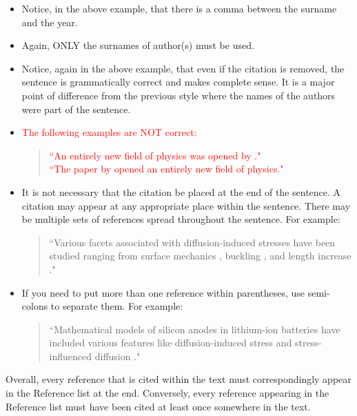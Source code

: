 \begin{itemize}
\item Notice, in the above example, that there is a comma between the surname and the year. 

\item Again, ONLY the surnames of author(s) must be used. 

\item Notice, again in the above example, that even if the citation is removed, the sentence is grammatically correct and makes complete sense. It is a major point of difference from the previous style where the names of the authors were part of the sentence. 

\item \textcolor{red}{The following examples are NOT correct:}
\begin{quote}
\textcolor{red}{``An entirely new field of physics was opened by \citep{Einstein3}."} \\
\textcolor{red}{``The paper by \citep{Einstein3} opened an entirely new field of physics."}
\end{quote}

\item It is not necessary that the citation be placed at the end of the sentence. A citation may appear at any appropriate place within the sentence. There may be multiple sets of references spread throughout the sentence. For example:
\begin{quote}
``Various facets associated with diffusion-induced stresses have been studied ranging from surface mechanics \citep{2008ChengVerbrugge}, buckling \citep{2015IJSSChakraborty}, and length increase \citep{2015JPSChakraborty}."
\end{quote}


\item If you need to put more than one reference within parentheses, use semi-colons to separate them. For example:
\begin{quote}
``Mathematical models of silicon anodes in lithium-ion batteries have included various features like diffusion-induced stress and stress-influenced diffusion \citep{2008ChengVerbrugge, 2013JMPSCui}."
\end{quote}
\end{itemize}

\vspace{0.5cm}

 Overall, every reference that is cited within the text must correspondingly appear in the Reference list at the end. Conversely, every reference appearing in the Reference list must have been cited at least once somewhere in the text. 

